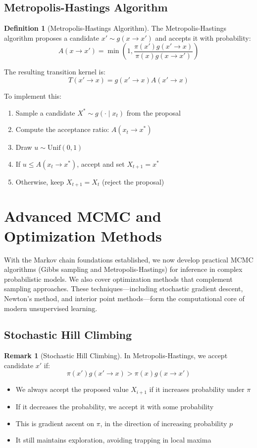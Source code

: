 \documentclass[12pt,a4paper]{article}
\theoremstyle{definition}
\newtheorem{definition}{Definition}[section]
\newtheorem{remark}{Remark}[section]
\begin{document}
\subsection{Metropolis-Hastings Algorithm}

\begin{definition}[Metropolis-Hastings Algorithm]
The Metropolis-Hastings algorithm proposes a candidate $x' \sim g(x \to x')$ and accepts it with probability:
\[
A(x \to x') = \min\left(1, \frac{\pi(x') g(x' \to x)}{\pi(x) g(x \to x')}\right)
\]

The resulting transition kernel is:
\[
T(x' \to x) = g(x' \to x) A(x' \to x)
\]

To implement this:
\begin{enumerate}
    \item Sample a candidate $X^* \sim g(\cdot \mid x_t)$ from the proposal
    \item Compute the acceptance ratio: $A(x_t \to x^*)$ 
    \item Draw $u \sim \text{Unif}(0,1)$
    \item If $u \leq A(x_t \to x^*)$, accept and set $X_{t+1} = x^*$
    \item Otherwise, keep $X_{t+1} = X_t$ (reject the proposal)
\end{enumerate}
\end{definition}


\section{Advanced MCMC and Optimization Methods}

With the Markov chain foundations established, we now develop practical MCMC algorithms (Gibbs sampling and Metropolis-Hastings) for inference in complex probabilistic models. We also cover optimization methods that complement sampling approaches. These techniques—including stochastic gradient descent, Newton's method, and interior point methods—form the computational core of modern unsupervised learning.

\subsection{Stochastic Hill Climbing}

\begin{remark}[Stochastic Hill Climbing]
In Metropolis-Hastings, we accept candidate $x'$ if:
\[
\pi(x') g(x' \to x) > \pi(x) g(x \to x')
\]
\begin{itemize}
    \item We always accept the proposed value $X_{i+1}$ if it increases probability under $\pi$
    \item If it decreases the probability, we accept it with some probability
    \item This is gradient ascent on $\pi$, in the direction of increasing probability $p$
    \item It still maintains exploration, avoiding trapping in local maxima
\end{itemize}
\end{remark}
\end{document}
